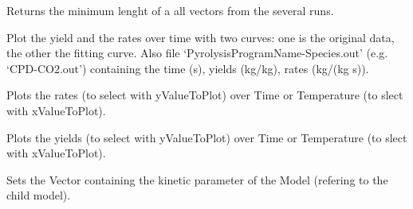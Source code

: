 \documentclass[letterpaper,10pt,english]{sphinxmanual}
\begin{document}
\begin{fulllineitems}
\begin{fulllineitems}
\end{fulllineitems}


\begin{fulllineitems}
\label{FittingClasses:Models.Model.minLengthOfVectors}
Returns the minimum lenght of a all vectors from the several runs.

\end{fulllineitems}


\begin{fulllineitems}
\label{FittingClasses:Models.Model.plot}
Plot the yield and the rates over time with two curves: one is the original data, the other the fitting curve. Also file `PyrolysisProgramName-Species.out' (e.g. `CPD-CO2.out') containing the time (s), yields (kg/kg), rates (kg/(kg s)).

\end{fulllineitems}


\begin{fulllineitems}
\label{FittingClasses:Models.Model.pltRate}
Plots the rates (to select with yValueToPlot) over Time or Temperature (to slect with xValueToPlot).

\end{fulllineitems}


\begin{fulllineitems}
\label{FittingClasses:Models.Model.pltYield}
Plots the yields (to select with yValueToPlot) over Time or Temperature (to slect with xValueToPlot).

\end{fulllineitems}


\begin{fulllineitems}
\label{FittingClasses:Models.Model.setParamVector}
Sets the Vector containing the kinetic parameter of the Model (refering to the child model).

\end{fulllineitems}


\end{fulllineitems}
\end{document}
